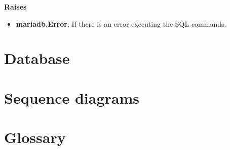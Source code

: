 \documentclass[oneside, nenglish]{sdqtechreport}
\begin{document}

\textbf{Raises}

\begin{itemize}
    \item \textbf{mariadb.Error}: If there is an error executing the SQL commands.
\end{itemize}





\chapter{Database}
\label{chap:Database}

\chapter{Sequence diagrams}
\label{chap:Sequence diagrams}

\chapter{Glossary}
\label{chap:Glossary}
\end{document}
